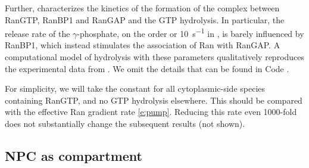 \documentclass[12pt,notitlepage]{article}
\def\[#1\]{\begin{align}#1\end{align}}
\begin{document}
%


%

Further,
\cite[\href{https://i.ibb.co/jz37PW1/image.png}{Fig.~13}]{SeewaldETAL2003}
characterizes
the kinetics of the formation of the complex
between
{RanGTP}, {{RanBP1}} and {RanGAP}
and the GTP hydrolysis.
%
%
In particular, 
the release rate of the $\gamma$-phosphate,
on the order or \SI{10}{s^{-1}} in 
\cite[\href{https://i.ibb.co/jz37PW1/image.png}{Fig.~13}]{SeewaldETAL2003},
is barely influenced by {{RanBP1}},
which instead stimulates
the association of {Ran} with {RanGAP}.
%
%
%
A computational model of hydrolysis
with these parameters qualitatively reproduces
the experimental data from
\cite[\href{https://i.ibb.co/6ghqPB7/image.jpg}{Fig.~4A}]{LounsburyMacara1997}.
%
%
We omit the details
that can be found in Code \protect{}.

%

For simplicity,
we will take the constant
\[
	\label{e:hydrolysis}
\]
for all cytoplasmic-side species containing {RanGTP},
and
no {GTP} hydrolysis elsewhere.
%
%
This should be compared with 
the effective {Ran} gradient rate \eqref{e:pump}.
%
%
Reducing this rate even 1000-fold
does not substantially change the subsequent results
(not shown).









\subsection{NPC as compartment} \label{ss:3s}
\end{document}
